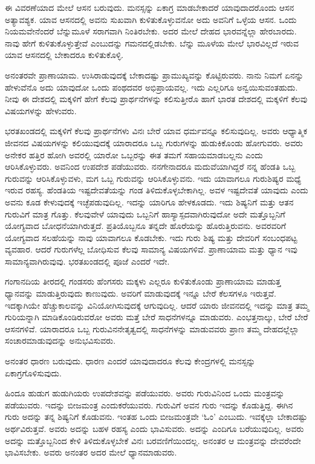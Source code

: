 ಈ ವಿವರಣೆಯಾದ ಮೇಲೆ ಆಸನ ಬರುವುದು. ಮನಸ್ಸನ್ನು ಏಕಾಗ್ರ ಮಾಡಬೇಕಾದರೆ ಯಾವುದಾದರೊಂದು ಆಸನ ಅತ್ಯಾವಶ್ಯಕ. ಯಾವ ಆಸನದಲ್ಲಿ ಅವನು ಸುಖವಾಗಿ ಕುಳಿತುಕೊಳ್ಳುವನೋ ಅದು ಅವನಿಗೆ ಒಳ್ಳೆಯ ಆಸನ. ಒಂದು ನಿಯಮವೇನೆಂದರೆ ಬೆನ್ನುಮೂಳೆ ಸರಾಗವಾಗಿ ನಿಂತಿರಬೇಕು. ಅದರ ಮೇಲೆ ದೇಹದ ಭಾರವನ್ನೆಲ್ಲಾ ಹೇರಬಾರದು. ನಾವು ಹೇಗೆ ಕುಳಿತುಕೊಳ್ಳುತ್ತೇವೆ ಎಂಬುದನ್ನು ಗಮನದಲ್ಲಿಡಬೇಕು. ಬೆನ್ನು ಮೂಳೆಯ ಮೇಲೆ ಭಾರವಿಲ್ಲದೆ ಇರುವ ಯಾವ ಆಸನದಲ್ಲಿ ಬೇಕಾದರೂ ಕುಳಿತುಕೊಳ್ಳಿ.

ಅನಂತರವೇ ಪ್ರಾಣಾಯಾಮ. ಉಸಿರಾಡುವುದಕ್ಕೆ ಬೇಕಾದಷ್ಟು ಪ್ರಾಮುಖ್ಯವನ್ನು ಕೊಟ್ಟಿರುವರು. ನಾನು ನಿಮಗೆ ಏನನ್ನು ಹೇಳುವೆನೊ ಅದು ಯಾವುದೋ ಒಂದು ಪಂಥದವರ ಅಭಿಪ್ರಾಯವಲ್ಲ. ಇದು ಎಲ್ಲರಿಗೂ ಅನ್ವಯಿಸುವಂತಹುದು. ನೀವು ಈ ದೇಶದಲ್ಲಿ ಮಕ್ಕಳಿಗೆ ಹೇಗೆ ಕೆಲವು ಪ್ರಾರ್ಥನೆಗಳನ್ನು ಕಲಿಸುತ್ತೀರೊ ಹಾಗೆ ಭಾರತ ದೇಶದಲ್ಲಿ ಮಕ್ಕಳಿಗೆ ಕೆಲವು ವಿಷಯಗಳನ್ನು ಹೇಳುವರು.

ಭರತಖಂಡದಲ್ಲಿ ಮಕ್ಕಳಿಗೆ ಕೆಲವು ಪ್ರಾರ್ಥನೆಗಳು ವಿನಃ ಬೇರೆ ಯಾವ ಧರ್ಮವನ್ನೂ ಕಲಿಸುವುದಿಲ್ಲ. ಅವರು ಆಧ್ಯಾತ್ಮಿಕ ಜೀವನದ ವಿಷಯಗಳನ್ನು ಕಲಿಯುವುದಕ್ಕೆ ಯಾರಾದರೂ ಒಬ್ಬ ಗುರುಗಳನ್ನು ಹುಡುಕಿಕೊಂಡು ಹೋಗುವರು. ಅವರು ಅನೇಕರ ಹತ್ತಿರ ಹೋಗಿ ಅವರಲ್ಲಿ ಯಾರೋ ಒಬ್ಬರನ್ನು ಈತ ತಮಗೆ ಸಹಾಯಮಾಡಬಲ್ಲನು ಎಂದು ಆರಿಸಿಕೊಳ್ಳುವರು. ಅವನಿಂದ ಉಪದೇಶ ಪಡೆಯುವರು. ನನಗೇನಾದರೂ ಮದುವೆಯಾಗಿದ್ದರೆ ನನ್ನ ಹೆಂಡತಿ ಒಬ್ಬ ಗುರುವನ್ನು ಆರಿಸಿಕೊಳ್ಳುವಳು, ಮಗ ಒಬ್ಬ ಗುರುವನ್ನು ಆರಿಸಿಕೊಳ್ಳುವನು. ಇದು ಯಾವಾಗಲೂ ಗುರುಶಿಷ್ಯರ ಮಧ್ಯೆ ಇರುವ ರಹಸ್ಯ. ಹೆಂಡತಿಯ ಇಷ್ಟದೇವತೆಯನ್ನು ಗಂಡ ತಿಳಿದುಕೊಳ್ಳಬೇಕಾಗಿಲ್ಲ. ಅವಳ ಇಷ್ಟದೇವತೆ ಯಾವುದು ಎಂದು ಅವನು ಕೂಡ ಕೇಳುವುದಕ್ಕೆ ಇಚ್ಛೆಪಡುವುದಿಲ್ಲ. ಇದನ್ನು ಯಾರಿಗೂ ಹೇಳಕೂಡದು. ಇದು ಶಿಷ್ಯನಿಗೆ ಮತ್ತು ಆತನ ಗುರುವಿಗೆ ಮಾತ್ರ ಗೊತ್ತು. ಕೆಲವುವೇಳೆ ಯಾವುದು ಒಬ್ಬನಿಗೆ ಹಾಸ್ಯಾಸ್ಪದವಾಗಿರುವುದೋ ಅದೇ ಮತ್ತೊಬ್ಬನಿಗೆ ಯೋಗ್ಯವಾದ ಬೋಧನೆಯಾಗಿರುತ್ತದೆ. ಪ್ರತಿಯೊಬ್ಬನೂ ತನ್ನದೇ ಹೊರೆಯನ್ನು ಹೊರುತ್ತಿರುವನು. ಅವರವರಿಗೆ ಯೋಗ್ಯವಾದ ಸಲಹೆಯನ್ನು ನಾವು ಯಾವಾಗಲೂ ಕೊಡಬೇಕು. ಇದು ಗುರು ಶಿಷ್ಯ ಮತ್ತು ದೇವರಿಗೆ ಸಂಬಂಧಪಟ್ಟ ವ್ಯವಹಾರ. ಆದರೆ ಗುರುಗಳೆಲ್ಲ ಬೋಧಿಸುವ ಕೆಲವು ಸಾಮಾನ್ಯ ವಿಷಯಗಳಿವೆ. ಪ್ರಾಣಾಯಾಮ ಮತ್ತು ಧ್ಯಾನ ಇವು ಸಾಮಾನ್ಯವಾಗಿರುವುವು. ಭರತಖಂಡದಲ್ಲಿ ಪೂಜೆ ಎಂದರೆ ಇದೇ.

ಗಂಗಾನದಿಯ ತೀರದಲ್ಲಿ ಗಂಡಸರು ಹೆಂಗಸರು ಮಕ್ಕಳು ಎಲ್ಲರೂ ಕುಳಿತುಕೊಂಡು ಪ್ರಾಣಾಯಾಮ ಮಾಡುತ್ತ ಧ್ಯಾನವನ್ನು ಮಾಡುತ್ತಿರುವುದು ಕಾಣುವುದು. ಅವರಿಗೆ ಮಾಡುವುದಕ್ಕೆ ಇನ್ನೂ ಬೇರೆ ಕೆಲಸಗಳೂ ಇರುತ್ತವೆ. ಇದಕ್ಕಾಗಿಯೇ ಹೆಚ್ಚುಕಾಲವನ್ನು ವಿನಿಯೋಗಿಸುವುದಕ್ಕೆ ಆಗುವುದಿಲ್ಲ. ಆದರೆ ಯಾರು ಜೀವನದಲ್ಲಿ ಇದನ್ನು ಮಾತ್ರ ತಮ್ಮ ಗುರಿಯನ್ನಾಗಿ ಮಾಡಿಕೊಂಡಿರುವರೋ ಅವರು ಮತ್ತೆ ಬೇರೆ ಸಾಧನೆಗಳನ್ನೂ ಮಾಡುವರು. ಎಂಭತ್ತನಾಲ್ಕು, ಬೇರೆ ಬೇರೆ ಆಸನಗಳಿವೆ. ಯಾರಾದರೂ ಒಬ್ಬ ಗುರುವಿನ\break ನೇತೃತ್ವದಲ್ಲಿ ಸಾಧನೆಗಳನ್ನು ಮಾಡುವವರು ಪ್ರಾಣ ತಮ್ಮ ದೇಹದಲ್ಲೆಲ್ಲಾ ಸಂಚಾರಮಾಡುವುದನ್ನು ಅನುಭವಿಸುವರು.

ಅನಂತರ ಧಾರಣ ಬರುವುದು. ಧಾರಣ ಎಂದರೆ ಯಾವುದಾದರೂ ಕೆಲವು ಕೇಂದ್ರಗಳಲ್ಲಿ ಮನಸ್ಸನ್ನು ಏಕಾಗ್ರಗೊಳಿಸುವುದು.

ಹಿಂದೂ ಹುಡುಗ ಹುಡುಗಿಯರು ಉಪದೇಶವನ್ನು ಪಡೆಯುವರು. ಅವರು ಗುರುವಿನಿಂದ ಒಂದು ಮಂತ್ರವನ್ನು ಪಡೆಯುವರು. ಇದನ್ನು ಬೀಜಮಂತ್ರ ಎಂದು\break ಕರೆಯುವರು. ಗುರುವಿಗೆ ಅವನ ಗುರು ಇದನ್ನು ಕೊಡುತ್ತಿದ್ದ. ಈಗಿನ ಗುರು ಅದನ್ನು ತನ್ನ ಶಿಷ್ಯನಿಗೆ ಕೊಡುವನು. ಇಂತಹ ಒಂದು ಬೀಜಮಂತ್ರವೇ `ಓಂ' ಎಂಬುದು. ಇವಕ್ಕೆಲ್ಲಾ ಬೇಕಾದಷ್ಟು ಅರ್ಥವಿರುತ್ತವೆ. ಅವರು ಅದನ್ನು ಬಹಳ ರಹಸ್ಯ ಎಂದು ಭಾವಿಸುವರು. ಅದನ್ನು ಎಂದಿಗೂ ಬರೆಯುವುದಿಲ್ಲ. ಅವರು ಅದನ್ನು ಮತ್ತೊಬ್ಬನಿಂದ ಕೇಳಿ ತಿಳಿದುಕೊಳ್ಳಬೇಕೆ ವಿನಃ ಬರವಣಿಗೆಯಿಂದಲ್ಲ. ಅನಂತರ ಆ ಮಂತ್ರವನ್ನು ದೇವರೆಂದೇ ಭಾವಿಸಬೇಕು. ಅವರು ಅನಂತರ ಅದರ ಮೇಲೆ ಧ್ಯಾನಮಾಡುವರು.

